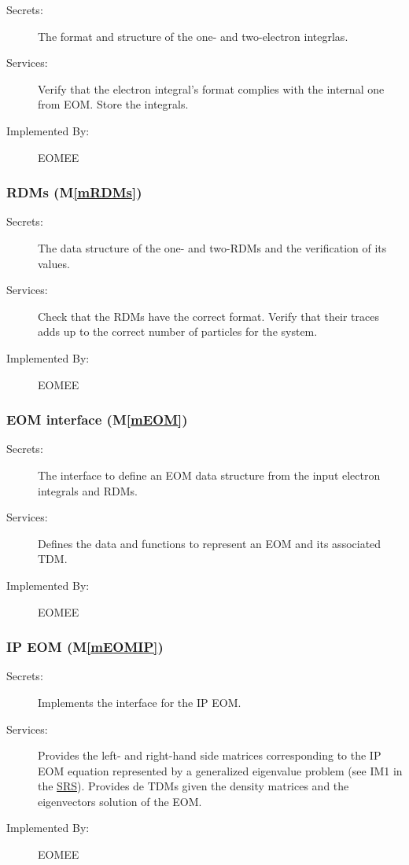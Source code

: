 \documentclass[12pt, titlepage]{article}
\newcommand{\mref}[1]{M\ref{#1}}
\begin{document}
\begin{description}
	\item[Secrets:]The format and structure of the one- and two-electron 
	integrlas.
	\item[Services:] Verify that the electron integral's format complies with 
	the internal one from EOM. Store the integrals.
	\item[Implemented By:] EOMEE
\end{description}

\subsubsection{RDMs (\mref{mRDMs})}

\begin{description}
	\item[Secrets:]The data structure of the one- and two-RDMs and the 
	verification of its values.
	\item[Services:] Check that the RDMs have the correct format. Verify that 
	their traces adds up to the correct number of particles for the system.
	\item[Implemented By:] EOMEE
\end{description}

\subsubsection{EOM interface (\mref{mEOM})}

\begin{description}
	\item[Secrets:] The interface to define an EOM data structure from the 
	input electron integrals and RDMs.
	\item[Services:] Defines the data and functions to represent an EOM and 
	its associated TDM.
	\item[Implemented By:] EOMEE
\end{description}

\subsubsection{IP EOM (\mref{mEOMIP})}

\begin{description}
	\item[Secrets:] Implements the interface for the IP EOM.
	\item[Services:] Provides the left- and right-hand side matrices 
	corresponding to the IP EOM equation represented by a generalized 
	eigenvalue problem (see IM1 in the 
	\href{https://github.com/gabrielasd/eomee/tree/cas741/docs/SRS/}{SRS}). 
	Provides 
	de TDMs given the density matrices and the 
	eigenvectors solution of the EOM.
	\item[Implemented By:] EOMEE
\end{description}
\end{document}

